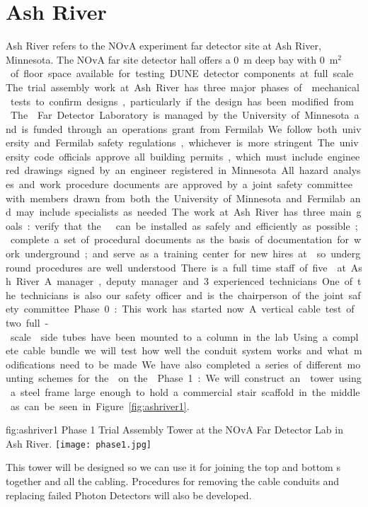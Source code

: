 \section{Ash River}

Ash River refers to the NOvA experiment far detector site at Ash
River, Minnesota. The NOvA far site detector hall offers a \SI{0}{m}
deep bay with \SI{0}{m$^2$} of floor space available for testing DUNE
detector components at full scale.  The trial assembly work at Ash
River has three major phases of  mechanical tests to
confirm designs, particularly if the design has been modified from
.  The  Far Detector Laboratory is
managed by the University of Minnesota and is funded through an
operations grant from Fermilab.  We follow both university and
Fermilab safety regulations, whichever is more stringent.  The
university code officials approve all building permits, which must
include engineered drawings signed by an engineer registered in
Minnesota. All hazard analyses and work procedure documents are
approved by a joint safety committee with members drawn from both the
University of Minnesota and Fermilab and may include specialists as
needed.

The work at Ash River has three main goals: verify that the
  can be installed as safely and efficiently as
possible; complete a set of procedural documents as the basis of
documentation for work underground; and serve as a training center for
new hires at \surf so underground procedures are well understood.

There is a full time staff of five  at Ash River. A manager,
deputy manager and 3 experienced technicians.  One of the technicians
is also our safety officer and is the chairperson of the joint safety
committee.


Phase 0: This work has started now.  A vertical cable test of two
full-scale  side tubes have been mounted to a column in the
lab. Using a complete cable bundle we will test how well the conduit
system works and what modifications need to be made. We have also
completed a series of different mounting schemes for the 
on the .

Phase 1: We will construct an  tower using a steel frame large
enough to hold a commercial stair scaffold in the middle as can be
seen in Figure ~\ref{fig:ashriver1}.
\begin{dunefigure}{fig:ashriver1}
  {Phase 1 Trial Assembly  Tower at the NOvA Far Detector Lab in Ash River.}
  \texttt{[image: phase1.jpg]}
\end{dunefigure}
This  tower will be designed so we can
use it for joining the top and bottom s together and all the
cabling. Procedures for removing the cable conduits and replacing
failed Photon Detectors will also be developed.


